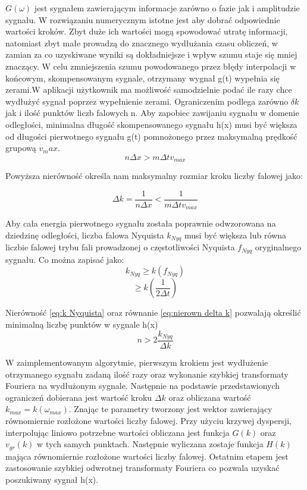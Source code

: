 $G(\omega)$ jest sygnałem zawierającym informacje zarówno o fazie jak i amplitudzie sygnału. W rozwiązaniu numerycznym istotne jest aby dobrać odpowiednie wartości kroków. Zbyt duże ich wartości mogą spowodować utratę informacji, natomiast zbyt małe prowadzą do znacznego wydłużania czasu obliczeń, w zamian za co uzyskiwane wyniki są dokładniejsze i wpływ szumu staje się mniej znaczący. W celu zmniejszenia szumu powodowanego przez błędy interpolacji w końcowym, skompensowanym sygnale, otrzymany wygnał g(t) wypełnia się zerami.W aplikacji użytkownik ma możliwość samodzielnie podać ile razy chce wydłużyć sygnał poprzez wypełnienie zerami. Ograniczenim podlega zarówno $\delta k$ jak i ilość punktów liczb falowych n. Aby zapobiec zawijaniu sygnału w domenie odległości, minimalna długość skompensowanego sygnału h(x) musi być większa od długości pierwotnego sygnału g(t) pomnożonego przez maksymalną prędkość grupową $v_max$.
\begin{equation}
n\Delta x > m\Delta tv_{max}\label{eq:nierownosc dlugosci sygnalow}
\end{equation} 

Powyższa nierówność określa nam maksymalny rozmiar kroku liczby falowej jako:

\begin{equation}
\Delta k = \frac{1}{n\Delta x} < \frac{1}{ m\Delta tv_{max}}\label{eq:nierown delta k}
\end{equation}

Aby cała energia pierwotnego sygnału została poprawnie odwzorowana na dziedzinę odległości, liczba falowa Nyquista $k_{Nyq}$ musi być większa lub równa liczbie falowej trybu fali prowadzonej o częstotliwości Nyquista $f_{Nyq}$ oryginalnego sygnału. Co można zapisać jako:
\begin{equation}
k_{Nyq}\geq k(f_{Nyq})\label{eq:k Nyquista}
\end{equation}
$$
\geq k(\frac{1}{2\Delta t})
$$

Nierówność \ref{eq:k Nyquista} oraz równanie \ref{eq:nierown delta k} pozwalają określić minimalną liczbę punktów w sygnale h(x)
\begin{equation}
n > 2\frac{k_{Nyq}}{\Delta k}
\end{equation}

W zaimplementowanym algorytmie, pierwszym krokiem jest wydłużenie otrzymanego sygnału zadaną ilość razy oraz wykonanie szybkiej transformaty Fouriera na wydłużonym sygnale. Następnie na podstawie przedstawionych ograniczeń dobierana jest wartość kroku $\Delta k$ oraz obliczana wartość $k_{max} = k(\omega _{max})$. Znając te parametry tworzony jest wektor zawierający równomiernie rozłożone wartości liczby falowej. Przy użyciu krzywej dyspersji, interpolując liniowo potrzebne wartości obliczana jest funkcja $G(k)$ oraz $v_{gr}(k)$ w tych samych punktach. Następnie wyliczana zostaje funkcja $H(k)$ mająca równomiernie rozłożone wartości liczby falowej. Ostatnim etapem jest zastosowanie szybkiej odwrotnej transformaty Fouriera co pozwala uzyskać poszukiwany sygnał h(x).

